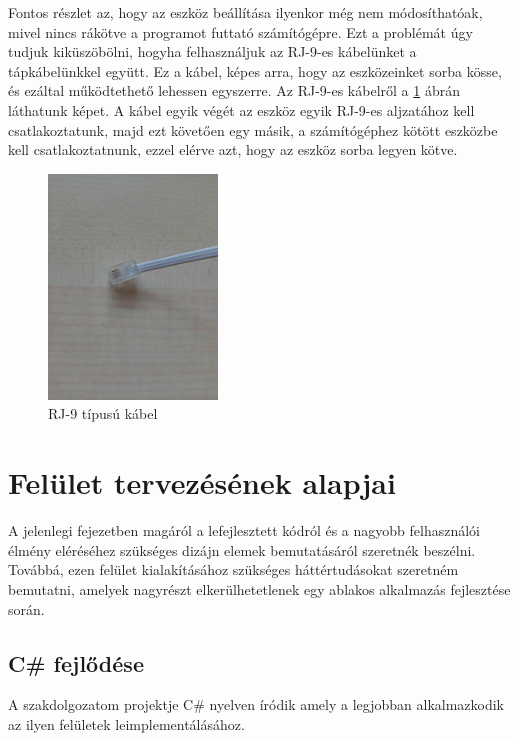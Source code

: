 \documentclass[tocnopagenum]{thesis-ekf}
\theoremstyle{definition}
\theoremstyle{remark}
\begin{document}
	Fontos részlet az, hogy az eszköz beállítása ilyenkor még nem módosíthatóak, mivel nincs rákötve a programot futtató számítógépre. Ezt a problémát úgy tudjuk kiküszöbölni, hogyha felhasználjuk az RJ-9-es kábelünket a tápkábelünkkel együtt. Ez a kábel, képes arra, hogy az eszközeinket sorba kösse, és ezáltal működtethető lehessen egyszerre.
	Az RJ-9-es kábelről a \ref{fig:rj9_kabel} ábrán láthatunk képet. A kábel egyik végét az eszköz egyik RJ-9-es aljzatához kell csatlakoztatunk, majd ezt követően egy másik, a számítógéphez kötött eszközbe kell csatlakoztatnunk, ezzel elérve azt, hogy az eszköz sorba legyen kötve.
	\begin{figure}[H]	
		\centering
		\includegraphics[page=1,width=0.4\textwidth]{rj9_kabel}
		\caption[RJ-9 típusú kábel]{RJ-9 típusú kábel}
		\label{fig:rj9_kabel}
	\end{figure}
\newpage

	\section{Felület tervezésének alapjai}
	A jelenlegi fejezetben magáról a lefejlesztett kódról és a nagyobb felhasználói élmény eléréséhez szükséges dizájn elemek bemutatásáról szeretnék beszélni. Továbbá, ezen felület kialakításához szükséges háttértudásokat szeretném bemutatni, amelyek nagyrészt elkerülhetetlenek egy ablakos alkalmazás fejlesztése során.
	\subsection{C\# fejlődése}
	A szakdolgozatom projektje C\# nyelven íródik amely a legjobban alkalmazkodik az ilyen felületek leimplementálásához. 
	
\end{document}
